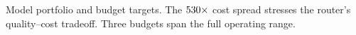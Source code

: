 Model portfolio and budget targets. The $530{\times}$ cost spread stresses the router's quality--cost tradeoff. Three budgets span the full operating range.

